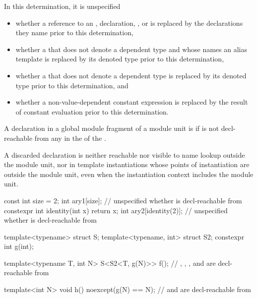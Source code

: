 In this determination, it is unspecified
\begin{itemize}
\item
whether a reference to an
,
 declaration,
, or
is replaced by the declarations they name
prior to this determination,

\item
whether a 
that does not denote a dependent type
and whose  names an alias template
is replaced by its denoted type
prior to this determination,

\item
whether a 
that does not denote a dependent type
is replaced by its denoted type
prior to this determination,
and

\item
whether a non-value-dependent constant expression
is replaced by the result of constant evaluation
prior to this determination.
\end{itemize}

\pnum
A declaration  in a global module fragment of a module unit
is  if 
is not decl-reachable from any 
in the 
of the .
\begin{note}
A discarded declaration is neither reachable
nor visible to name lookup outside the module unit,
nor in template instantiations whose points of instantiation
are outside the module unit,
even when the instantiation context
includes the module unit.
\end{note}

\pnum
\begin{example}
\begin{codeblock}
const int size = 2;
int ary1[size];                 // unspecified whether  is decl-reachable from 
constexpr int identity(int x) { return x; }
int ary2[identity(2)];          // unspecified whether  is decl-reachable from 

template<typename> struct S;
template<typename, int> struct S2;
constexpr int g(int);

template<typename T, int N>
S<S2<T, g(N)>> f();             // , , , and \tcode{::} are decl-reachable from 

template<int N>
void h() noexcept(g(N) == N);   //  and \tcode{::} are decl-reachable from 
\end{codeblock}
\end{example}

